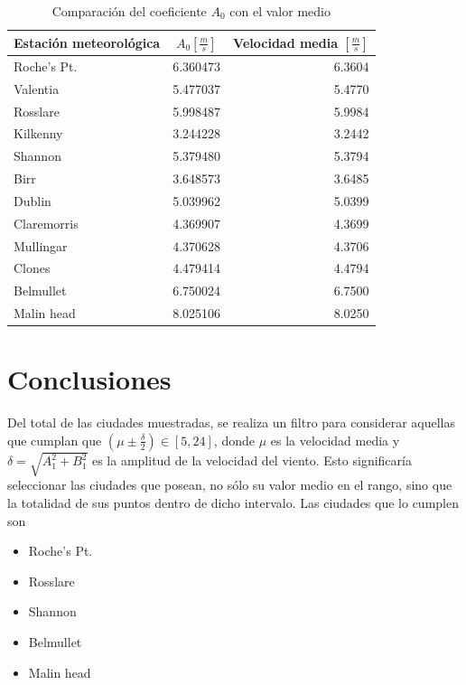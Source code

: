 \documentclass[journal, monochrome]{IEEEtran}
\begin{document}
\begin{table}
	\begin{center}
		\begin{tabular}{l|c|r}
			Estación meteorológica & $A_{0} [\frac{m}{s}]$ &  Velocidad media $[\frac{m}{s}]$\\
			\hline
			Roche's Pt. & 6.360473 &  6.3604 \\ 
			Valentia & 5.477037 &  5.4770 \\
			Rosslare & 5.998487 &  5.9984 \\
			Kilkenny & 3.244228 & 3.2442 \\
			Shannon & 5.379480 & 5.3794 \\
			Birr & 3.648573 &3.6485 \\
			Dublin & 5.039962 &  5.0399 \\
			Claremorris & 4.369907 & 4.3699  \\
			Mullingar & 4.370628 &  4.3706  \\
			Clones & 4.479414 &  4.4794 \\
			Belmullet & 6.750024 & 6.7500 \\
			Malin head & 8.025106 &  8.0250 \\
		\end{tabular}
		\caption{Comparación del coeficiente $A_0$ con el valor medio}
		\label{table:comparison}
	\end{center}
\end{table}



\vspace{1cm}
\section{Conclusiones}
\label{section:conclusions}
\vspace{0.5cm}

Del total de las ciudades muestradas, se realiza un filtro para considerar aquellas que cumplan que $ (\mu \pm \frac{\delta}{2}) \in [5,24]$, donde $\mu$ es la velocidad media y  $ \delta =  \sqrt{ A_1^2 + B_1^2 } $ es la amplitud de la velocidad del viento. Esto significaría seleccionar las ciudades que posean, no sólo su valor medio en el rango, sino que la totalidad de sus puntos dentro de dicho intervalo. Las ciudades que lo cumplen son

\begin{itemize}
\item Roche's Pt.
\item Rosslare
\item Shannon
\item Belmullet
\item Malin head
\end{itemize}
\end{document}
